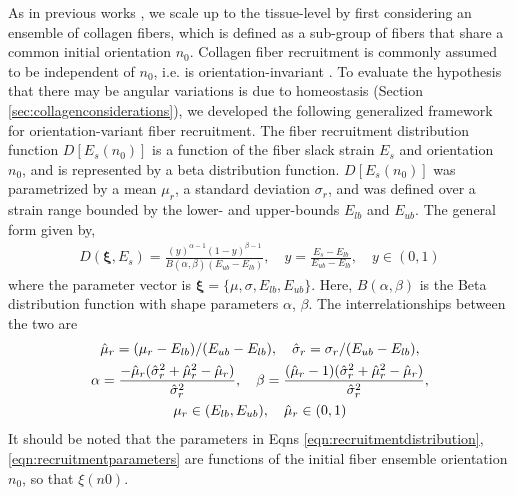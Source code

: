     As in previous works \cite{lanir_constitutive_1983,sacks_incorporation_2003,fan_simulation_2014}, we scale up to the tissue-level by first considering an ensemble of collagen fibers, which is defined as a sub-group of fibers that share a common initial orientation $n_0$. Collagen fiber recruitment is commonly assumed to be independent of $n_0$, i.e. is orientation-invariant \cite{fata_insights_2014,sacks_incorporation_2003,lanir_structural_1979,fan_simulation_2014}. To evaluate the hypothesis that there may be angular variations is due to homeostasis (Section \ref{sec:collagenconsiderations}), we developed the following generalized framework for orientation-variant fiber recruitment. The fiber recruitment distribution function $D\left[E_s(n_0)\right]$ is a function of the fiber slack strain $E_s$ and orientation $n_0$, and is represented by a beta distribution function. $D\left[E_s(n_0)\right]$ was parametrized by a mean $\mu_r$, a standard deviation $\sigma_r$, and was defined over a strain range bounded by the lower- and upper-bounds $E_{lb}$ and $E_{ub}$. The general form given by,
        \begin{equation}\label{eqn:recruitmentdistribution}
        \begin{aligned}
        D(\mathbf{\xi},E_s) = \frac{(y)^{\alpha-1}(1-y)^{\beta-1}}{B(\alpha,\beta)(E_{ub}-E_{lb})}, 
            \quad y = \frac{E_s - E_{lb}}{E_{ub} - E_{lb}}, \quad y \in (0,1)
        \end{aligned}
        \end{equation}
    where the parameter vector is $\mathbf{\xi} = \{\mu, \sigma, E_{lb}, E_{ub} \}$. Here, $B(\alpha, \beta)$ is the Beta distribution function with shape parameters $\alpha$, $\beta$. The interrelationships between the two are
        \begin{equation}\label{eqn:recruitmentparameters}
        \begin{gathered}
        \hat{\mu}_r = (\mu_r - E_{lb})/(E_{ub} - E_{lb}), \quad \hat{\sigma}_r = \sigma_r/(E_{ub} - E_{lb}),  \\
        \alpha = \frac{-\hat{\mu}_r (\hat{\sigma}_r^2 + \hat{\mu}_r^2 - \hat{\mu}_r)}{\hat{\sigma}_r^2}, \quad \beta = \frac{(\hat{\mu}_r - 1) (\hat{\sigma}_r^2 + \hat{\mu}_r^2 - \hat{\mu}_r)}{\hat{\sigma}_r^2}, \\
        \mu_r \in (E_{lb}, E_{ub}), \quad \Hat{\mu}_r \in (0,1)
        \end{gathered}
        \end{equation}
    It should be noted that the parameters in Eqns \ref{eqn:recruitmentdistribution}, \ref{eqn:recruitmentparameters} are functions of the initial fiber ensemble orientation $n_0$, so that $\xi (n0)$.


